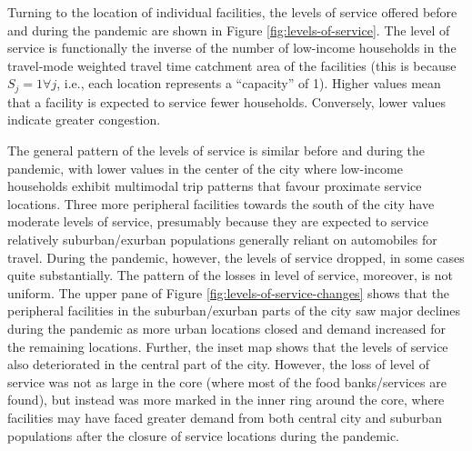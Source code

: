 \documentclass[]{elsarticle} %
\begin{document}
Turning to the location of individual facilities, the levels of service
offered before and during the pandemic are shown in Figure
\ref{fig:levels-of-service}. The level of service is functionally the
inverse of the number of low-income households in the travel-mode
weighted travel time catchment area of the facilities (this is because
\(S_j=1 \forall j\), i.e., each location represents a ``capacity'' of
1). Higher values mean that a facility is expected to service fewer
households. Conversely, lower values indicate greater congestion.

The general pattern of the levels of service is similar before and
during the pandemic, with lower values in the center of the city where
low-income households exhibit multimodal trip patterns that favour
proximate service locations. Three more peripheral facilities towards
the south of the city have moderate levels of service, presumably
because they are expected to service relatively suburban/exurban
populations generally reliant on automobiles for travel. During the
pandemic, however, the levels of service dropped, in some cases quite
substantially. The pattern of the losses in level of service, moreover,
is not uniform. The upper pane of Figure
\ref{fig:levels-of-service-changes} shows that the peripheral facilities
in the suburban/exurban parts of the city saw major declines during the
pandemic as more urban locations closed and demand increased for the
remaining locations. Further, the inset map shows that the levels of
service also deteriorated in the central part of the city. However, the
loss of level of service was not as large in the core (where most of the
food banks/services are found), but instead was more marked in the inner
ring around the core, where facilities may have faced greater demand
from both central city and suburban populations after the closure of
service locations during the pandemic.
\end{document}
